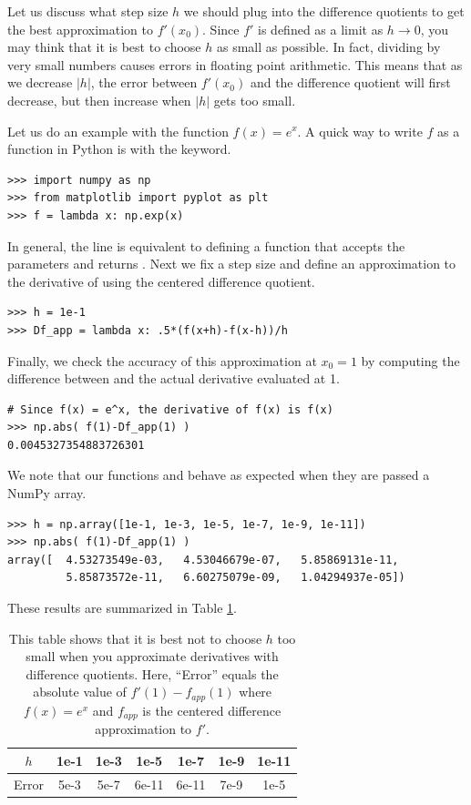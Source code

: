 Let us discuss what step size $h$ we should plug into the difference quotients to get the best approximation to $f'(x_0)$.
Since $f'$ is defined as a limit as $h \rightarrow 0$, you may think that it is best to choose $h$ as small as possible.
In fact, dividing by very small numbers causes errors in floating point arithmetic.
This means that as we decrease $|h|$, the error between $f'(x_0)$ and the difference quotient will first decrease, but then increase when $|h|$ gets too small. 

Let us do an example with the function $f(x) = e^x$. A quick way to write $f$ as a function in Python is with the  keyword.
\begin{lstlisting}
>>> import numpy as np
>>> from matplotlib import pyplot as plt
>>> f = lambda x: np.exp(x)
\end{lstlisting}
In general, the line  is equivalent to defining a function  that accepts the parameters  and returns .
Next we fix a step size  and define an approximation to the derivative of  using the centered difference quotient.
\begin{lstlisting}
>>> h = 1e-1
>>> Df_app = lambda x: .5*(f(x+h)-f(x-h))/h
\end{lstlisting}
Finally, we check the accuracy of this approximation at $x_0=1$ by computing the difference between  and the actual derivative evaluated at 1.
\begin{lstlisting}
# Since f(x) = e^x, the derivative of f(x) is f(x)
>>> np.abs( f(1)-Df_app(1) )
0.0045327354883726301
\end{lstlisting}
We note that our functions  and  behave as expected when they are passed a NumPy array.
\begin{lstlisting}
>>> h = np.array([1e-1, 1e-3, 1e-5, 1e-7, 1e-9, 1e-11])
>>> np.abs( f(1)-Df_app(1) )
array([  4.53273549e-03,   4.53046679e-07,   5.85869131e-11,
         5.85873572e-11,   6.60275079e-09,   1.04294937e-05])
\end{lstlisting}
These results are summarized in Table \ref{table:approx_errors}.

\begin{table}
\begin{center}
\begin{tabular}{|c|c|c|c|c|c|c|}
\hline
$h$ 		& 1e-1 & 1e-3 & 1e-5 & 1e-7	 & 1e-9 & 1e-11 \\ \hline
Error  	& 5e-3 & 5e-7 & 6e-11 & 6e-11 & 7e-9 & 1e-5\\ \hline
\end{tabular}
\caption{This table shows that it is best not to choose $h$ too small when you approximate derivatives with difference quotients. Here, ``Error'' equals the absolute value of $f'(1)-f_{app}(1)$ where $f(x) = e^x$ and $f_{app}$ is the centered difference approximation to $f'$.}
\label{table:approx_errors}
\end{center}
\end{table}

